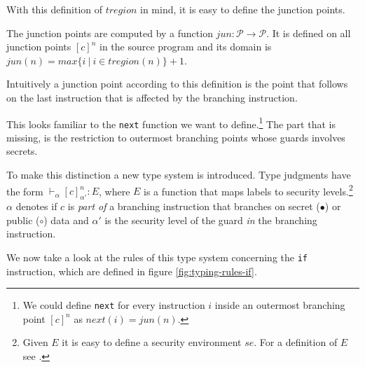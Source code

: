 \documentclass[a4paper,10pt]{llncs}
\begin{document}
With this definition of $tregion$ in mind, it is easy to define the junction points.

\begin{definition}
The junction points are computed by a function $jun: \mathcal{P} \rightarrow \mathcal{P}$. It is defined
on all junction points $[c]^n$ in the source program and its domain is $jun(n) = max \{i\ |\ i \in tregion(n)\} + 1$.
\end{definition}

Intuitively a junction point according to this definition is the point that follows on the last instruction
that is affected by the branching instruction.

This looks familiar to the \texttt{next} function we want to define.\footnote{We could define \texttt{next} for
every instruction $i$ inside an outermost branching point $[c]^n$ as $next(i) = jun(n)$.} The part that is
missing, is the restriction to outermost branching points whose guards involves secrets.

To make this distinction a new type system is introduced. Type judgments have the form
$\vdash_\alpha [c]_{\alpha'}^n : E$, where $E$ is a function that maps labels to security
levels.\footnote{Given $E$ it is easy to define a security environment $se$. For a definition
of $E$ see \cite{Barthe06}.} $\alpha$ denotes if $c$ is \textit{part of} a branching
instruction that branches on secret ($\bullet$) or public ($\circ$) data and $\alpha'$ is the
security level of the guard \textit{in} the branching instruction.

We now take a look at the rules of this type system concerning the \texttt{if} instruction, which are
defined in figure \ref{fig:typing-rules-if}.
\end{document}
